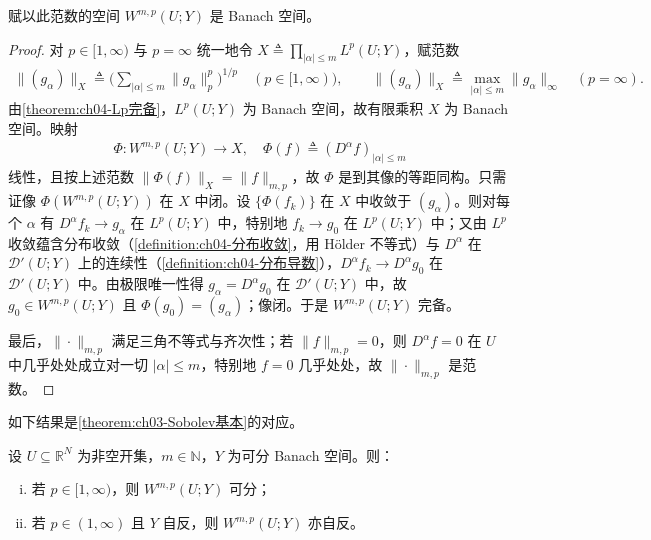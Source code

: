 \documentclass[../../main.tex]{subfiles}%
\begin{document}
赋以此范数的空间 $W^{m,p}(U;Y)$ 是 Banach 空间。

\begin{proof}
对 $p\in[1,\infty)$ 与 $p=\infty$ 统一地令 $X\triangleq\prod_{|\alpha|\leqslant m}L^p(U;Y)$，赋范数
\begin{align*}
\|(g_\alpha)\|_X\triangleq\Big(\sum_{|\alpha|\leqslant m}\|g_\alpha\|_p^p\Big)^{1/p}\quad(p\in[1,\infty)),\qquad\|(g_\alpha)\|_X\triangleq\max_{|\alpha|\leqslant m}\|g_\alpha\|_\infty\quad(p=\infty).
\end{align*}
由\cref{theorem:ch04-Lp完备}，$L^p(U;Y)$ 为 Banach 空间，故有限乘积 $X$ 为 Banach 空间。映射
\begin{align*}
\Phi:W^{m,p}(U;Y)\to X,\quad\Phi(f)\triangleq(D^\alpha f)_{|\alpha|\leqslant m}
\end{align*}
线性，且按上述范数 $\|\Phi(f)\|_X=\|f\|_{m,p}$，故 $\Phi$ 是到其像的等距同构。只需证像 $\Phi(W^{m,p}(U;Y))$ 在 $X$ 中闭。设 $\{\Phi(f_k)\}$ 在 $X$ 中收敛于 $(g_\alpha)$。则对每个 $\alpha$ 有 $D^\alpha f_k\to g_\alpha$ 在 $L^p(U;Y)$ 中，特别地 $f_k\to g_0$ 在 $L^p(U;Y)$ 中；又由 $L^p$ 收敛蕴含分布收敛（\cref{definition:ch04-分布收敛}，用 Hölder 不等式）与 $D^\alpha$ 在 $\mathcal{D}'(U;Y)$ 上的连续性（\cref{definition:ch04-分布导数}），$D^\alpha f_k\to D^\alpha g_0$ 在 $\mathcal{D}'(U;Y)$ 中。由极限唯一性得 $g_\alpha=D^\alpha g_0$ 在 $\mathcal{D}'(U;Y)$ 中，故 $g_0\in W^{m,p}(U;Y)$ 且 $\Phi(g_0)=(g_\alpha)$；像闭。于是 $W^{m,p}(U;Y)$ 完备。

最后，$\|\cdot\|_{m,p}$ 满足三角不等式与齐次性；若 $\|f\|_{m,p}=0$，则 $D^\alpha f=0$ 在 $U$ 中几乎处处成立对一切 $|\alpha|\leqslant m$，特别地 $f=0$ 几乎处处，故 $\|\cdot\|_{m,p}$ 是范数。
\end{proof}

如下结果是\cref{theorem:ch03-Sobolev基本}的对应。

\begin{theorem}\label{theorem:ch04-Sobolev可分自反}
设 $U\subseteq\mathbb{R}^N$ 为非空开集，$m\in\mathbb{N}$，$Y$ 为可分 Banach 空间。则：
\begin{enumerate}[(i)]
\item\label{item:ch04-Sobolev可分自反-i} 若 $p\in[1,\infty)$，则 $W^{m,p}(U;Y)$ 可分；
\item\label{item:ch04-Sobolev可分自反-ii} 若 $p\in(1,\infty)$ 且 $Y$ 自反，则 $W^{m,p}(U;Y)$ 亦自反。
\end{enumerate}
\end{theorem}
\end{document}
